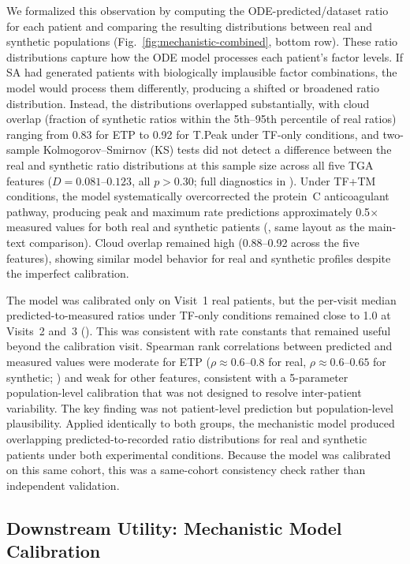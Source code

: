 We formalized this observation by computing the ODE-predicted/dataset ratio for each
patient and comparing the resulting distributions between real and synthetic
populations (Fig.~\ref{fig:mechanistic-combined}, bottom row). These ratio
distributions capture how the ODE model processes each patient's factor levels. If
SA had generated patients with biologically implausible factor combinations, the
model would process them differently, producing a shifted or broadened ratio
distribution. Instead, the distributions overlapped substantially, with cloud
overlap (fraction of synthetic ratios within the 5th--95th percentile of real
ratios) ranging from 0.83 for ETP to 0.92 for T.Peak under TF-only conditions,
and two-sample Kolmogorov--Smirnov (KS) tests did not detect a difference between
the real and synthetic ratio distributions at this sample size across all five TGA features
($D = 0.081$--$0.123$, all $p > 0.30$; full diagnostics in
).
Under TF+TM conditions, the model systematically overcorrected the protein~C
anticoagulant pathway, producing peak and maximum rate predictions
approximately 0.5$\times$ measured values for both real and synthetic patients
(, same layout as the main-text
comparison). Cloud overlap remained high (0.88--0.92 across the
five features), showing similar model behavior for real and synthetic profiles despite the
imperfect calibration.

The model was calibrated only on Visit~1 real patients, but the per-visit median predicted-to-measured
ratios under TF-only conditions remained close to 1.0 at Visits~2 and~3
(). This was consistent with rate constants that remained useful
beyond the calibration visit. Spearman rank correlations between predicted and measured values were
moderate for ETP ($\rho \approx 0.6$--$0.8$ for real, $\rho \approx 0.6$--$0.65$
for synthetic; ) and weak for other features, consistent with
a 5-parameter population-level calibration that was not designed to resolve
inter-patient variability. The key finding was not patient-level prediction but
population-level plausibility. Applied identically to both groups, the mechanistic model
produced overlapping predicted-to-recorded ratio distributions for real and synthetic patients
under both experimental conditions. Because the model was calibrated on this same cohort, this
was a same-cohort consistency check rather than independent validation.

\subsection{Downstream Utility: Mechanistic Model Calibration}
\label{sec:results-utility}

